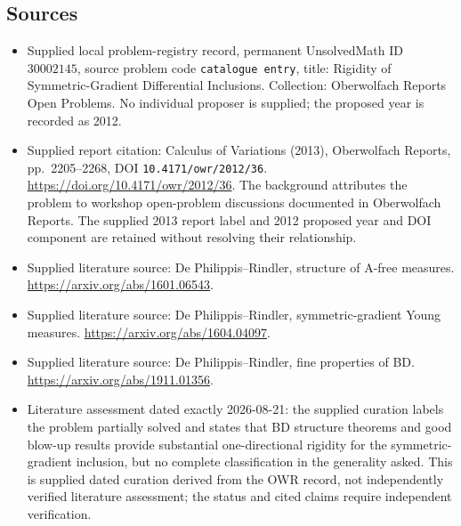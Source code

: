 \documentclass[11pt]{article}
\begin{document}
\subsection{Sources}
\begin{itemize}
\item Supplied local problem-registry record, permanent UnsolvedMath ID \(30002145\), source problem code \texttt{catalogue entry}, title: Rigidity of Symmetric-Gradient Differential Inclusions. Collection: Oberwolfach Reports Open Problems. No individual proposer is supplied; the proposed year is recorded as 2012.
\item Supplied report citation: Calculus of Variations (2013), Oberwolfach Reports, pp.~2205--2268, DOI \texttt{10.4171/owr/2012/36}. \url{https://doi.org/10.4171/owr/2012/36}. The background attributes the problem to workshop open-problem discussions documented in Oberwolfach Reports. The supplied 2013 report label and 2012 proposed year and DOI component are retained without resolving their relationship.
\item Supplied literature source: De Philippis--Rindler, structure of A-free measures. \url{https://arxiv.org/abs/1601.06543}.
\item Supplied literature source: De Philippis--Rindler, symmetric-gradient Young measures. \url{https://arxiv.org/abs/1604.04097}.
\item Supplied literature source: De Philippis--Rindler, fine properties of BD. \url{https://arxiv.org/abs/1911.01356}.
\item Literature assessment dated exactly 2026-08-21: the supplied curation labels the problem partially solved and states that BD structure theorems and good blow-up results provide substantial one-directional rigidity for the symmetric-gradient inclusion, but no complete classification in the generality asked. This is supplied dated curation derived from the OWR record, not independently verified literature assessment; the status and cited claims require independent verification.
\end{itemize}
\end{document}
